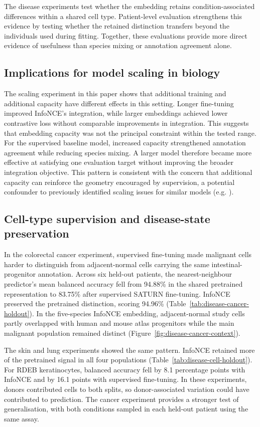 \documentclass{article}
\begin{document}
The disease experiments test whether the embedding retains condition-associated differences within a shared cell type. Patient-level evaluation strengthens this evidence by testing whether the retained distinction transfers beyond the individuals used during fitting. Together, these evaluations provide more direct evidence of usefulness than species mixing or annotation agreement alone.

\subsection{Implications for model scaling in biology}
The scaling experiment in this paper shows that additional training and additional capacity have different effects in this setting. Longer fine-tuning improved InfoNCE's integration, while larger embeddings achieved lower contrastive loss without comparable improvements in integration. This suggests that embedding capacity was not the principal constraint within the tested range. For the supervised baseline model, increased capacity strengthened annotation agreement while reducing species mixing. A larger model therefore became more effective at satisfying one evaluation target without improving the broader integration objective. This pattern is consistent with the concern that additional capacity can reinforce the geometry encouraged by supervision, a potential confounder to previously identified scaling issues for similar models (e.g. \cite{BioScaling}).

\subsection{Cell-type supervision and disease-state preservation}
In the colorectal cancer experiment, supervised fine-tuning made malignant cells harder to distinguish from adjacent-normal cells carrying the same intestinal-progenitor annotation. Across six held-out patients, the nearest-neighbour predictor's mean balanced accuracy fell from 94.88\% in the shared pretrained representation to 83.75\% after supervised SATURN fine-tuning. InfoNCE preserved the pretrained distinction, scoring 94.96\% (Table~\ref{tab:disease-cancer-holdout}). In the five-species InfoNCE embedding, adjacent-normal study cells partly overlapped with human and mouse atlas progenitors while the main malignant population remained distinct (Figure~\ref{fig:disease-cancer-context}).

The skin and lung experiments showed the same pattern. InfoNCE retained more of the pretrained signal in all four populations (Table~\ref{tab:disease-cell-holdout}). For RDEB keratinocytes, balanced accuracy fell by 8.1 percentage points with InfoNCE and by 16.1 points with supervised fine-tuning. In these experiments, donors contributed cells to both splits, so donor-associated variation could have contributed to prediction. The cancer experiment provides a stronger test of generalisation, with both conditions sampled in each held-out patient using the same assay.
\end{document}
